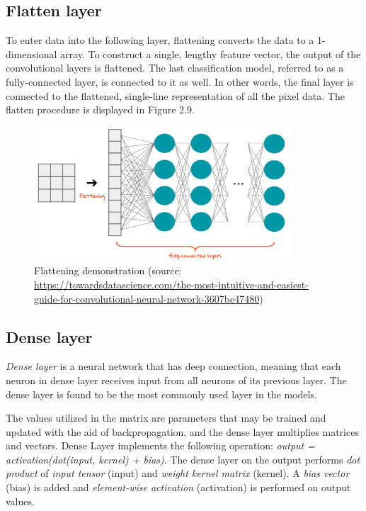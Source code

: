 \subsection{Flatten layer}
\hspace{0.5cm}To enter data into the following layer, flattening converts the data to a 1-dimensional array. To construct a single, lengthy feature vector, the output of the convolutional layers is flattened. The last classification model, referred to as a fully-connected layer, is connected to it as well. In other words, the final layer is connected to the flattened, single-line representation of all the pixel data. The flatten procedure is displayed in Figure 2.9.
\begin{figure}[!h]
	\centering
	\includegraphics[width=\linewidth, height=5cm,keepaspectratio]{figures/flattening.png}
   \caption{Flattening demonstration (source: \url{https://towardsdatascience.com/the-most-intuitive-and-easiest-guide-for-convolutional-neural-network-3607be47480})}
\end{figure}
\newpage
\subsection{Dense layer}
\hspace{0.5cm}\emph{Dense layer} is a neural network that has deep connection, meaning that each neuron in dense layer receives input from all neurons of its previous layer. The dense layer is found to be the most commonly used layer in the models.

The values utilized in the matrix are parameters that may be trained and updated with the aid of backpropagation, and the dense layer multiplies matrices and vectors. Dense Layer implements the following operation: \textit{output = activation(dot(input, kernel) + bias)}. The dense layer on the output performs \textit{dot product} of \textit{input tensor} (input) and \textit{weight kernel matrix} (kernel). A \textit{bias vector} (bias) is added and \textit{element-wise activation} (activation) is performed on output values. 

